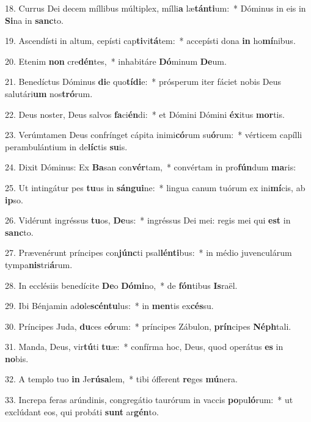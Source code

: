 18. Currus Dei decem míllibus múltiplex, mílli\textbf{a} læ\textbf{tán}\textbf{ti}um:~*  Dóminus in eis in \textbf{Si}na in \textbf{sanc}to.\

19. Ascendísti in altum, cepísti cap\textbf{ti}vi\textbf{tá}tem:~*  accepísti dona \textbf{in} ho\textbf{mí}nibus.\

20. Etenim \textbf{non} cre\textbf{dén}tes,~*  inhabitáre \textbf{Dó}minum \textbf{De}um.\

21. Benedíctus Dóminus \textbf{di}e quo\textbf{tí}\textbf{di}e:~*  prósperum iter fáciet nobis Deus salutári\textbf{um} nos\textbf{tró}rum.\

22. Deus noster, Deus salvos \textbf{fa}ci\textbf{én}di:~*  et Dómini Dómini \textbf{éx}itus \textbf{mor}tis.\

23. Verúmtamen Deus confrínget cápita inimi\textbf{có}rum su\textbf{ó}rum:~*  vérticem capílli perambulántium in de\textbf{líc}tis \textbf{su}is.\

24. Dixit Dóminus: Ex \textbf{Ba}san con\textbf{vér}tam,~*  convértam in pro\textbf{fún}dum \textbf{ma}ris:\

25. Ut intingátur pes \textbf{tu}us in \textbf{sán}\textbf{gui}ne:~*  lingua canum tuórum ex ini\textbf{mí}cis, ab \textbf{ip}so.\

26. Vidérunt ingréssus \textbf{tu}os, \textbf{De}us:~*  ingréssus Dei mei: regis mei qui \textbf{est} in \textbf{sanc}to.\

27. Prævenérunt príncipes con\textbf{júnc}ti psal\textbf{lén}\textbf{ti}bus:~*  in médio juvenculárum tympa\textbf{nis}tri\textbf{á}rum.\

28. In ecclésiis benedícite \textbf{De}o \textbf{Dó}\textbf{mi}no,~*  de \textbf{fón}tibus \textbf{Is}raël.\

29. Ibi Bénjamin ad\textbf{o}le\textbf{scén}\textbf{tu}lus:~*  in \textbf{men}tis ex\textbf{cés}su.\

30. Príncipes Juda, \textbf{du}ces e\textbf{ó}rum:~*  príncipes Zábulon, \textbf{prín}cipes \textbf{Néph}tali.\

31. Manda, Deus, vir\textbf{tú}ti \textbf{tu}æ:~*  confírma hoc, Deus, quod operátus \textbf{es} in \textbf{no}bis.\

32. A templo tuo \textbf{in} Je\textbf{rú}\textbf{sa}lem,~*  tibi ófferent \textbf{re}ges \textbf{mú}nera.\

33. Increpa feras arúndinis, congregátio taurórum in vaccis \textbf{po}pu\textbf{ló}rum:~*  ut exclúdant eos, qui probáti \textbf{sunt} ar\textbf{gén}to.\

